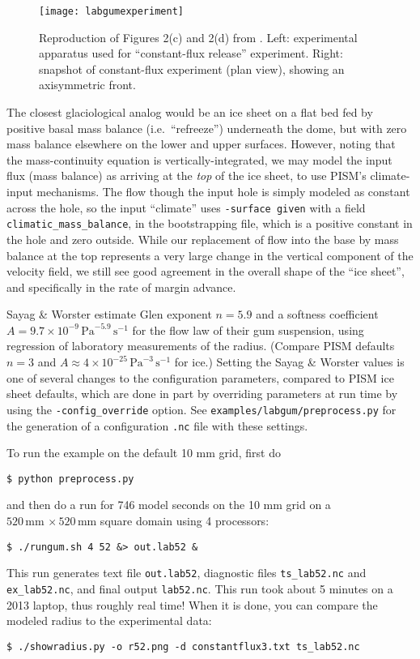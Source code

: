 \begin{figure}[ht]
\centering
\texttt{[image: labgumexperiment]}
\caption{Reproduction of Figures 2(c) and 2(d) from \cite{SayagWorster2013}.  Left: experimental  apparatus used for ``constant-flux release'' experiment.  Right: snapshot of constant-flux experiment (plan view), showing an axisymmetric front.}
\label{fig:labgumexperiment}
\end{figure}

The closest glaciological analog would be an ice sheet on a flat bed fed by positive basal mass balance (i.e.~``refreeze'') underneath the dome, but with zero mass balance elsewhere on the lower and upper surfaces.  However, noting that the mass-continuity equation is vertically-integrated, we may model the input flux (mass balance) as arriving at the \emph{top} of the ice sheet, to use PISM's climate-input mechanisms.  The flow though the input hole is simply modeled as constant across the hole, so the input ``climate'' uses \texttt{-surface given} with a field \texttt{climatic_mass_balance}, in the bootstrapping file, which is a positive constant in the hole and zero outside.  While our replacement of flow into the base by mass balance at the top represents a very large change in the vertical component of the velocity field, we still see good agreement in the overall shape of the ``ice sheet'', and specifically in the rate of margin advance.

Sayag \& Worster estimate Glen exponent $n = 5.9$ and a softness coefficient $A = 9.7 \times 10^{-9}\,\text{Pa}^{-5.9}\,\text{s}^{-1}$ for the flow law of their gum suspension, using regression of laboratory measurements of the radius.  (Compare PISM defaults $n=3$ and $A\approx 4\times 10^{-25}\,\text{Pa}^{-3}\,\text{s}^{-1}$ for ice.)  Setting the Sayag \& Worster values is one of several changes to the configuration parameters, compared to PISM ice sheet defaults, which are done in part by overriding parameters at run time by using the \texttt{-config_override} option.  See \texttt{examples/labgum/preprocess.py} for the generation of a configuration \texttt{.nc} file with these settings.

To run the example on the default 10 mm grid, first do
\begin{verbatim}
$ python preprocess.py
\end{verbatim}
and then do a run for 746 model seconds \cite{SayagWorster2013} on the 10 mm grid on a $520\,\text{mm}\,\times 520\,\text{mm}$ square domain using 4 processors:
\begin{verbatim}
$ ./rungum.sh 4 52 &> out.lab52 &
\end{verbatim}
This run generates text file \texttt{out.lab52}, diagnostic files \texttt{ts_lab52.nc} and \texttt{ex_lab52.nc}, and final output \texttt{lab52.nc}.  This run took about 5 minutes on a 2013 laptop, thus roughly real time!  When it is done, you can compare the modeled radius to the experimental data:
\begin{verbatim}
$ ./showradius.py -o r52.png -d constantflux3.txt ts_lab52.nc
\end{verbatim}

